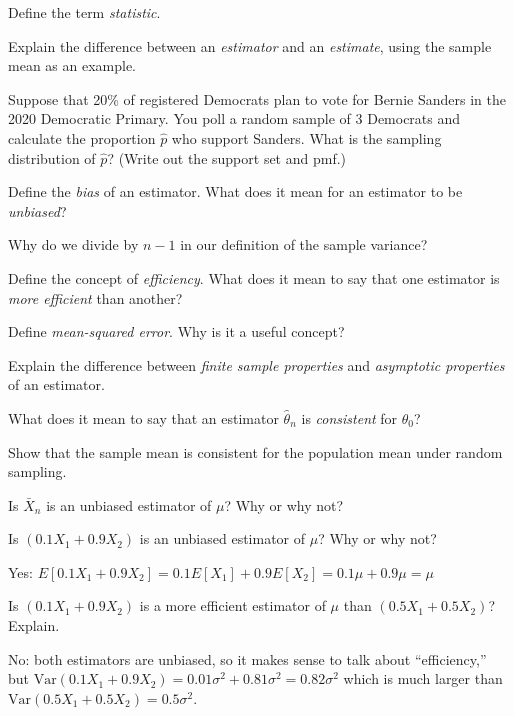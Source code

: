 \documentclass[addpoints,12pt]{exam}
\begin{document}
\begin{questions}
\question Define the term \emph{statistic}. 

\question Explain the difference between an \emph{estimator} and an \emph{estimate}, using the sample mean as an example.

\question Suppose that 20\% of registered Democrats plan to vote for Bernie Sanders in the 2020 Democratic Primary. 
You poll a random sample of 3 Democrats and calculate the proportion $\widehat{p}$ who support Sanders. 
What is the sampling distribution of $\widehat{p}$? 
(Write out the support set and pmf.)



\question Define the \emph{bias} of an estimator. What does it mean for an estimator to be \emph{unbiased}?

\question Why do we divide by $n-1$ in our definition of the sample variance?

\question Define the concept of \emph{efficiency}. What does it mean to say that one estimator is \emph{more efficient} than another?

\question Define \emph{mean-squared error}. Why is it a useful concept?

\question Explain the difference between \emph{finite sample properties} and \emph{asymptotic properties} of an estimator.

\question What does it mean to say that an estimator $\widehat{\theta}_n$ is \emph{consistent} for $\theta_0$?

\question Show that the sample mean is consistent for the population mean under random sampling.


  \question Is $\bar{X}_n$ is an unbiased estimator of $\mu$? Why or why not?

  \question Is $(0.1 X_1 + 0.9 X_2)$ is an unbiased estimator of $\mu$? Why or why not?
  \begin{solution}
    Yes: $E[0.1 X_1 + 0.9 X_2] = 0.1 E[X_1] + 0.9 E[X_2] = 0.1 \mu + 0.9\mu = \mu$
  \end{solution}

\question Is $(0.1X_1 + 0.9X_2)$ is a more efficient estimator of $\mu$ than $(0.5X_1 + 0.5X_2)$? Explain.
\begin{solution}
  No: both estimators are unbiased, so it makes sense to talk about ``efficiency,'' but $\mbox{Var}(0.1 X_1 + 0.9 X_2) = 0.01 \sigma^2 + 0.81 \sigma^2 = 0.82 \sigma^2$ which is much larger than $\mbox{Var}(0.5 X_1 + 0.5 X_2) = 0.5 \sigma^2$.
\end{solution}


\end{questions}
\end{document}
